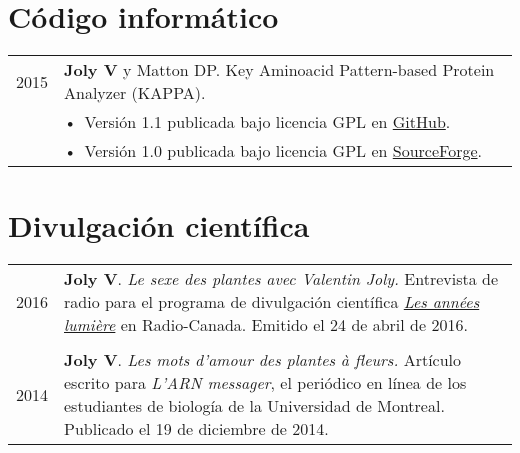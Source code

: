 \documentclass[letterpaper,12pt]{article}
\begin{document}
\vspace{6mm}

\section[Código informático]{Código informático}

\begin{tabularx}{\textwidth}{@{}r|X@{}}

2015
& \textbf{Joly V} y Matton DP. Key Aminoacid Pattern-based Protein Analyzer
  (KAPPA). \\
& \small \hspace{1.5mm} •~Versión 1.1 publicada bajo licencia GPL en
  \href{https://github.com/valentinjoly/kappa-1.1}{GitHub}. \\
& \small \hspace{1.5mm} •~Versión 1.0 publicada bajo licencia GPL en
  \href{https://sourceforge.net/projects/kappa-sequence-search/}{SourceForge}.
  \\

\end{tabularx}

\vspace{6mm}

\section[Divulgación científica]{Divulgación científica}

\begin{tabularx}{\textwidth}{@{}r|X@{}}

2016
& \textbf{Joly V}. {\em Le sexe des plantes avec Valentin Joly.} Entrevista de
  radio para el programa de divulgación científica
  \href{http://ici.radio-canada.ca/emissions/les_annees_lumiere/2009-2010/chronique.asp?idChronique=404672}{\emph{Les années lumière}}
  en Radio-Canada. Emitido el 24 de abril de 2016. \\

\multicolumn{2}{c}{} \\

2014
& \textbf{Joly V}. {\em Les mots d’amour des plantes à fleurs.} Artículo escrito
  para \emph{L'ARN messager}, el periódico en línea de los estudiantes de
  biología de la Universidad de Montreal. Publicado el 19 de diciembre de 2014.
  \\

\end{tabularx}

\newpage
\end{document}
